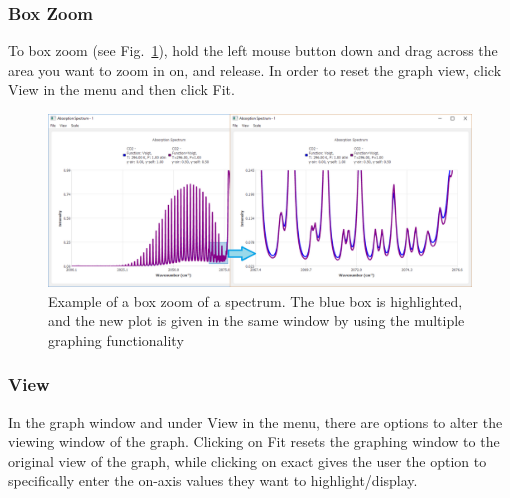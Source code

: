\documentclass[12pt]{article}
\begin{document}
\subsubsection*{Box Zoom}
To box zoom  (see Fig.~\ref{fig:graph_tab}), hold the left mouse button down and drag across the area you want to zoom in on, and release. In order to reset the graph view, click View in the menu and then click Fit.
\begin{figure}[h]
\centering
\includegraphics[scale = 0.4]{GraphBoxZoomBoth.png}
\caption{Example of a box zoom of a spectrum. The blue box is highlighted, and the new plot is given in the same window by using the multiple graphing functionality}
\label{fig:graph_tab}
\end{figure}

\subsubsection*{View}
In the graph window and under View in the menu, there are options to alter the viewing window of the graph. Clicking on Fit resets the graphing window to the original view of the graph, while clicking on exact gives the user the option to specifically enter the on-axis values they want to highlight/display.

\end{document}
